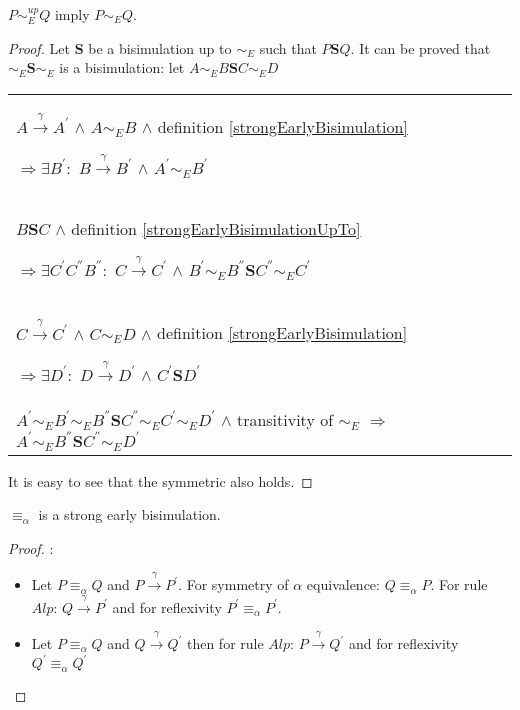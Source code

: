 \begin{proposition}\label{earlyBisimilarityUpToImplyEarlyBisimilarity}
  $P \sim_{E}^{up} Q$ imply $P \sim_{E} Q$.
  \begin{proof}
    Let $\mathbf{S}$ be a bisimulation up to $\sim_{E}$ such that $P \mathbf{S} Q$. It can be proved that $\sim_{E} \mathbf{S} \sim_{E}$ is a bisimulation: let $A \sim_{E} B \mathbf{S} C \sim_{E} D$
    \begin{center}
      \begin{tabular}{l}
	$A \xrightarrow{\gamma} A^{'}$ $\wedge$ $A \sim_{E} B$ $\wedge$ definition \ref{strongEarlyBisimulation} 
      
	$\Rightarrow \exists B^{'}:$ $B \xrightarrow{\gamma} B^{'}$ $\wedge$ $A^{'}\sim_{E} B^{'}$
      \\
	$B \mathbf{S} C$ $\wedge$ definition \ref{strongEarlyBisimulationUpTo}
      
	$\Rightarrow \exists C^{'} C^{''} B^{''}:$ $C \xrightarrow{\gamma} C^{'}$ $\wedge$ $B^{'} \sim_{E} B^{''} \mathbf{S} C^{''} \sim_{E} C^{'}$
      \\
	$C \xrightarrow{\gamma} C^{'}$ $\wedge$ $C \sim_{E} D$ $\wedge$ definition \ref{strongEarlyBisimulation} 
      
	$\Rightarrow \exists D^{'}:$ $D \xrightarrow{\gamma} D^{'}$ $\wedge$ $C^{'}\mathbf{S} D^{'}$
      \\
	$A^{'} \sim_{E} B^{'} \sim_{E} B^{''} \mathbf{S} C^{''} \sim_{E} C^{'} \sim_{E} D^{'}$ $\wedge$ transitivity of $\sim_{E}$
	$\Rightarrow$ $A^{'} \sim_{E} B^{''} \mathbf{S} C^{''} \sim_{E} D^{'}$
      \end{tabular}
    \end{center}
    It is easy to see that the symmetric also holds.
  \end{proof}
\end{proposition}

\begin{proposition}
  $\equiv_{\alpha}$ is a strong early bisimulation.
  \begin{proof}:
    \begin{itemize}
      \item
	Let $P\equiv_{\alpha} Q$ and $P\xrightarrow{\gamma}P^{'}$. For symmetry of $\alpha$ equivalence: $Q\equiv_{\alpha}P$. For rule $Alp$: $Q\xrightarrow{\gamma}P^{'}$ and for reflexivity $P^{'}\equiv_{\alpha}P^{'}$.
      \item
	Let $P\equiv_{\alpha} Q$ and $Q\xrightarrow{\gamma}Q^{'}$ then for rule $Alp$: $P\xrightarrow{\gamma}Q^{'}$ and for reflexivity $Q^{'}\equiv_{\alpha}Q^{'}$
    \end{itemize}
  \end{proof}
\end{proposition}


